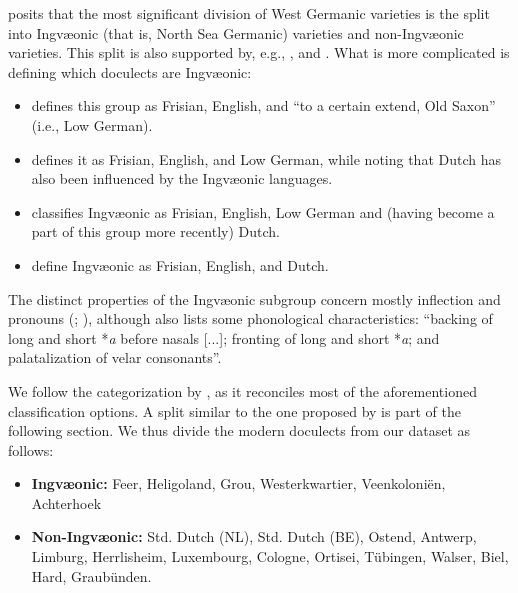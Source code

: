 \documentclass[a4paper]{article}
\begin{document}
\citet{stiles2013pan-west} posits that
the most significant division of West Germanic varieties is
the split into Ingv\ae{}onic (that is, North Sea Germanic) varieties
and non-Ingv\ae{}onic varieties.
This split is also supported by, e.g., \citet[p. 7]{harbert2007germanic}, \citet[pp. 117--123]{sonderegger1979grundzuege} and \cite{auwera2017germanic}.
What is more complicated is defining which doculects are Ingv\ae{}onic:
\begin{itemize}
\item 
\citet{stiles2013pan-west} defines this group
as Frisian, English, and ``to a certain extend, Old Saxon'' (i.e., Low German).

\item
\citet[pp. 7--8, 17]{harbert2007germanic} defines it
as Frisian, English, and Low German,
while noting that Dutch has also been influenced by the Ingv\ae{}onic languages.

\item
\citet[pp. 71, 117--123]{sonderegger1979grundzuege} classifies Ingv\ae{}onic
as Frisian, English, Low German and (having become a part of this group more recently) Dutch.

\item
{} define Ingv\ae{}onic as Frisian, English, and Dutch.
\end{itemize}

The distinct properties of the Ingv\ae{}onic subgroup
concern mostly inflection and pronouns
(\citet{stiles2013pan-west}; \citet[pp. 7-8]{harbert2007germanic}),
although \citet{stiles2013pan-west} also lists some phonological characteristics:
``backing of long and short *\textit{a} before nasals [...];
fronting of long and short *\textit{a};
and palatalization of velar consonants''.

We follow the categorization by \citet{harbert2007germanic}, 
as it reconciles most of the aforementioned classification options.
A split similar to the one proposed by \citet{sonderegger1979grundzuege}
is part of the following section.
We thus divide the modern doculects from our dataset as follows:

\begin{itemize}
\item 
\textbf{Ingv\ae{}onic:}
Feer, Heligoland, Grou,
Westerkwartier, Veenkoloni\"{e}n, Achterhoek

\item
\textbf{Non-Ingv\ae{}onic:}
Std. Dutch (NL), Std. Dutch (BE), Ostend, Antwerp, Limburg,
Herrlisheim, Luxembourg, Cologne,
Ortisei, T\"{u}bingen, Walser, Biel, Hard, Graub\"{u}nden.
\end{itemize}
\end{document}
